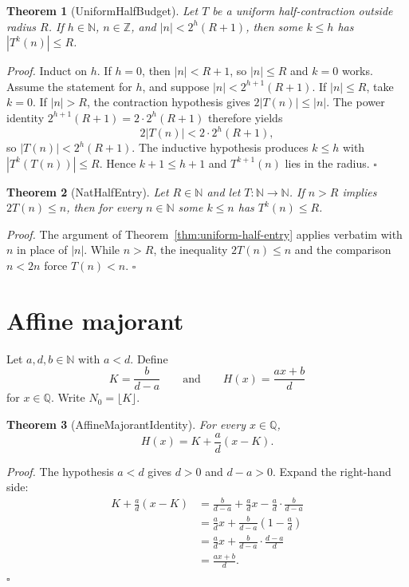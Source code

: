 \documentclass[11pt,letterpaper]{article}
\newcommand{\N}{\mathbb{N}}
\newcommand{\Z}{\mathbb{Z}}
\newcommand{\Q}{\mathbb{Q}}
\newcommand{\Map}[3]{#1 \colon #2 \to #3}
\newtheorem{theorem}{Theorem}
\newenvironment{proof}{\noindent\textit{Proof.}}{\hfill\(\square\)}
\begin{document}
\begin{theorem}[UniformHalfBudget]
\label{thm:uniform-half-budget}
Let \(T\) be a uniform half-contraction outside radius \(R\). If \(h\in\N\), \(n\in\Z\), and \(|n|<2^{h}(R+1)\), then some \(k\le h\) has \(|T^{k}(n)|\le R\).
\end{theorem}

\begin{proof}
Induct on \(h\). If \(h=0\), then \(|n|<R+1\), so \(|n|\le R\) and \(k=0\) works. Assume the statement for \(h\), and suppose \(|n|<2^{h+1}(R+1)\). If \(|n|\le R\), take \(k=0\). If \(|n|>R\), the contraction hypothesis gives \(2|T(n)|\le |n|\). The power identity \(2^{h+1}(R+1)=2\cdot 2^{h}(R+1)\) therefore yields
\[
2|T(n)|<2\cdot 2^{h}(R+1),
\]
so \(|T(n)|<2^{h}(R+1)\). The inductive hypothesis produces \(k\le h\) with \(|T^{k}(T(n))|\le R\). Hence \(k+1\le h+1\) and \(T^{k+1}(n)\) lies in the radius.
\end{proof}

\begin{theorem}[NatHalfEntry]
\label{thm:nat-half-entry}
Let \(R\in\N\) and let \(\Map{T}{\N}{\N}\). If \(n>R\) implies \(2T(n)\le n\), then for every \(n\in\N\) some \(k\le n\) has \(T^{k}(n)\le R\).
\end{theorem}

\begin{proof}
The argument of Theorem~\ref{thm:uniform-half-entry} applies verbatim with \(n\) in place of \(|n|\). While \(n>R\), the inequality \(2T(n)\le n\) and the comparison \(n<2n\) force \(T(n)<n\).
\end{proof}

\section{Affine majorant}

Let \(a,d,b\in\N\) with \(a<d\). Define
\[
K=\frac{b}{d-a}
\qquad\text{and}\qquad
H(x)=\frac{ax+b}{d}
\]
for \(x\in\Q\). Write \(N_{0}=\lfloor K\rfloor\).

\begin{theorem}[AffineMajorantIdentity]
\label{thm:affine-identity}
For every \(x\in\Q\),
\[
H(x)=K+\frac{a}{d}(x-K).
\]
\end{theorem}

\begin{proof}
The hypothesis \(a<d\) gives \(d>0\) and \(d-a>0\). Expand the right-hand side:
\begin{align*}
K+\frac{a}{d}(x-K)
&=\frac{b}{d-a}+\frac{a}{d}x-\frac{a}{d}\cdot\frac{b}{d-a}\\
&=\frac{a}{d}x+\frac{b}{d-a}\left(1-\frac{a}{d}\right)\\
&=\frac{a}{d}x+\frac{b}{d-a}\cdot\frac{d-a}{d}\\
&=\frac{ax+b}{d}.
\end{align*}
\end{proof}
\end{document}
